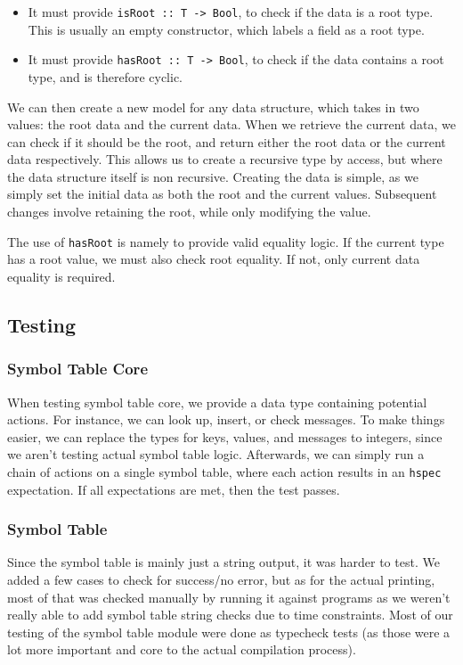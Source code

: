 \documentclass[11pt]{article}
\begin{document}
\begin{itemize}
	\item It must provide \texttt{isRoot :: T -> Bool}, to check if the data is a root type. This is usually an empty constructor, which labels a field as a root type.
	\item It must provide \texttt{hasRoot :: T -> Bool}, to check if the data contains a root type, and is therefore cyclic.
\end{itemize}

We can then create a new model for any data structure, which takes in two values: the root data and the current data.
When we retrieve the current data, we can check if it should be the root, and return either the root data or the current data respectively.
This allows us to create a recursive type by access, but where the data structure itself is non recursive.
Creating the data is simple, as we simply set the initial data as both the root and the current values.
Subsequent changes involve retaining the root, while only modifying the value.

The use of \texttt{hasRoot} is namely to provide valid equality logic.
If the current type has a root value, we must also check root equality.
If not, only current data equality is required.

\subsection{Testing}
\subsubsection{Symbol Table Core}
\label{sec:test-symbol-table-core}

When testing symbol table core, we provide a data type containing potential actions. For instance, we can look up, insert, or check messages.
To make things easier, we can replace the types for keys, values, and messages to integers, since we aren't testing actual symbol table logic.
Afterwards, we can simply run a chain of actions on a single symbol table, where each action results in an \texttt{hspec} expectation.
If all expectations are met, then the test passes.

\subsubsection{Symbol Table}

Since the symbol table is mainly just a string output, it was harder
to test. We added a few cases to check for success/no error, but as
for the actual printing, most of that was checked manually by running
it against programs as we weren't really able to add symbol table
string checks due to time constraints. Most of our testing of the
symbol table module were done as typecheck tests (as those were a lot
more important and core to the actual compilation process).
\end{document}
